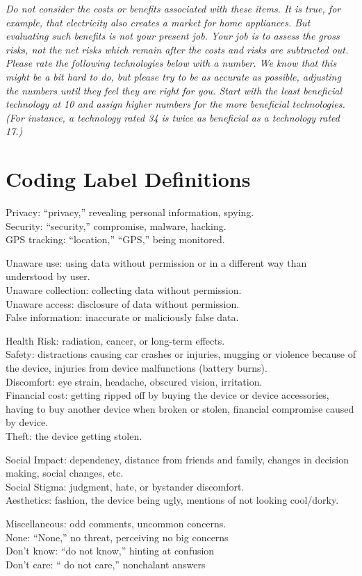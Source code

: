 \textit{Do not consider the costs or benefits associated with these items. It is true, for example, that electricity also creates a market for home appliances. But evaluating such benefits is not your present job. Your job is to assess the gross risks, not the net risks which remain after the costs and risks are subtracted out.} \\[-.6cm]

\textit{Please rate the following technologies below with a number. We know that this might be a bit hard to do, but please try to be as accurate as possible, adjusting the numbers until they feel they are right for you. Start with the least beneficial technology at 10 and assign higher numbers for the more beneficial technologies. (For instance, a technology rated 34 is twice as beneficial as a technology rated 17.)}

\section{Coding Label Definitions}
\label{sec:coding}

Privacy: ``privacy,'' revealing personal information, spying. \\
Security:  ``security,'' compromise, malware, hacking. \\
GPS tracking: ``location,'' ``GPS,'' being monitored. 

Unaware use: using data without permission or in a different way than understood by user. \\
Unaware collection: collecting data without permission. \\
Unaware access: disclosure of data without permission. \\
False information: inaccurate or maliciously false data.

Health Risk: radiation, cancer, or long-term effects.\\
Safety: distractions causing car crashes or injuries, mugging or violence because of the device, injuries from device malfunctions (battery burns).\\
Discomfort: eye strain, headache, obscured vision, irritation. \\
Financial cost: getting ripped off by buying the device or device accessories, having to buy another device when broken or stolen, financial compromise caused by device. \\
Theft: the device getting stolen. 

Social Impact: dependency, distance from friends and family, changes in decision making, social changes, etc. \\
Social Stigma: judgment, hate, or bystander discomfort.\\ 
Aesthetics: fashion, the device being ugly, mentions of not looking cool/dorky. 

Miscellaneous: odd comments, uncommon concerns. \\
None: ``None,'' no threat, perceiving no big concerns \\
Don't know: ``do not know,'' hinting at confusion \\
Don't care: `` do not care,'' nonchalant answers 